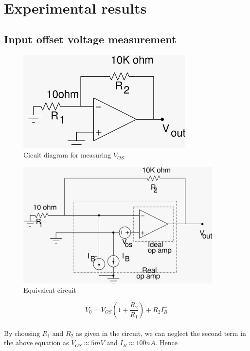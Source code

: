 \documentclass[12pt]{article}
\begin{document}
\section{Experimental results}

\subsection{Input offset voltage measurement}
\begin{figure}[H]
            \centering
            \includegraphics[width = 0.6\linewidth, height = 2in]{offset.jpeg}
            \caption{Cicuit diagram for measuring $V_{OS}$}
        \end{figure}
        
        \begin{figure}[H]
            \centering
            \includegraphics[width = 0.8\linewidth, height = 2.5in]{offset_real.jpeg}
            \caption{Equivalent circuit}
        \end{figure}
\begin{equation}
            V_0 = V_{OS}\left(1 + \frac{R_2}{R_1}\right) + R_2I^-_B 
        \end{equation}
      \\
        By choosing $R_1$ and $R_2$ as given in the circuit, we can neglect the second term in the above equation as $V_{OS} \approx 5mV$ and $I_B \approx 100 nA$. Hence
         
\end{document}
